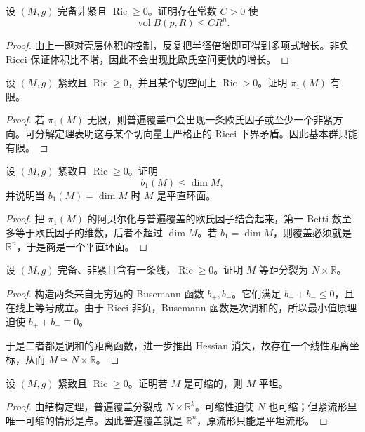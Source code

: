 \documentclass[11pt,a4paper,openany]{ctexbook}
\numberwithin{equation}{chapter}
\begin{document}
\begin{problem}
设 \((M,g)\) 完备非紧且 \(\operatorname{Ric}\ge 0\)。证明存在常数 \(C>0\) 使
\[
\operatorname{vol}B(p,R)\le CR^n.
\]
\end{problem}
\begin{proof}
由上一题对壳层体积的控制，反复把半径倍增即可得到多项式增长。非负 Ricci 保证体积比不增，因此不会出现比欧氏空间更快的增长。
\end{proof}

\begin{problem}
设 \((M,g)\) 紧致且 \(\operatorname{Ric}\ge 0\)，并且某个切空间上 \(\operatorname{Ric}>0\)。证明 \(\pi_1(M)\) 有限。
\end{problem}
\begin{proof}
若 \(\pi_1(M)\) 无限，则普遍覆盖中会出现一条欧氏因子或至少一个非紧方向。可分解定理表明这与某个切向量上严格正的 Ricci 下界矛盾。因此基本群只能有限。
\end{proof}

\begin{problem}
设 \((M,g)\) 紧致且 \(\operatorname{Ric}\ge 0\)。证明
\[
b_1(M)\le \dim M,
\]
并说明当 \(b_1(M)=\dim M\) 时 \(M\) 是平直环面。
\end{problem}
\begin{proof}
把 \(\pi_1(M)\) 的阿贝尔化与普遍覆盖的欧氏因子结合起来，第一 Betti 数至多等于欧氏因子的维数，后者不超过 \(\dim M\)。若 \(b_1=\dim M\)，则覆盖必须就是 \(\mathbb R^n\)，于是商是一个平直环面。
\end{proof}

\begin{problem}
设 \((M,g)\) 完备、非紧且含有一条线，\(\operatorname{Ric}\ge 0\)。证明 \(M\) 等距分裂为 \(N\times \mathbb R\)。
\end{problem}
\begin{proof}
构造两条来自无穷远的 Busemann 函数 \(b_+,b_-\)。它们满足 \(b_++b_-\le 0\)，且在线上等号成立。由于 Ricci 非负，Busemann 函数是次调和的，所以最小值原理迫使 \(b_++b_-\equiv 0\)。

于是二者都是调和的距离函数，进一步推出 Hessian 消失，故存在一个线性距离坐标，从而 \(M\cong N\times \mathbb R\)。
\end{proof}

\begin{problem}
设 \((M,g)\) 紧致且 \(\operatorname{Ric}\ge 0\)。证明若 \(M\) 是可缩的，则 \(M\) 平坦。
\end{problem}
\begin{proof}
由结构定理，普遍覆盖分裂成 \(N\times \mathbb R^k\)。可缩性迫使 \(N\) 也可缩；但紧流形里唯一可缩的情形是点。因此普遍覆盖就是 \(\mathbb R^n\)，原流形只能是平坦流形。
\end{proof}
\end{document}
